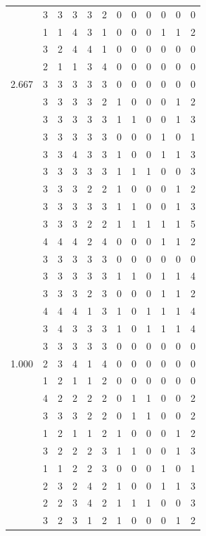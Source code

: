\documentclass[]{msu-thesis}
\theoremstyle{definition}
\theoremstyle{definition}
\theoremstyle{definition}
\theoremstyle{remark}
\begin{document}
\begin{table}
{\begin{tabular}[t]{rrrrrrrrrrrr}
 & 3 & 3 & 3 & 3 & 2 & 0 & 0 & 0 & 0 & 0 & 0\\
 & 1 & 1 & 4 & 3 & 1 & 0 & 0 & 0 & 1 & 1 & 2\\
 & 3 & 2 & 4 & 4 & 1 & 0 & 0 & 0 & 0 & 0 & 0\\
 & 2 & 1 & 1 & 3 & 4 & 0 & 0 & 0 & 0 & 0 & 0\\
2.667 & 3 & 3 & 3 & 3 & 3 & 0 & 0 & 0 & 0 & 0 & 0\\
 & 3 & 3 & 3 & 3 & 2 & 1 & 0 & 0 & 0 & 1 & 2\\
 & 3 & 3 & 3 & 3 & 3 & 1 & 1 & 0 & 0 & 1 & 3\\
 & 3 & 3 & 3 & 3 & 3 & 0 & 0 & 0 & 1 & 0 & 1\\
 & 3 & 3 & 4 & 3 & 3 & 1 & 0 & 0 & 1 & 1 & 3\\
 & 3 & 3 & 3 & 3 & 3 & 1 & 1 & 1 & 0 & 0 & 3\\
 & 3 & 3 & 3 & 2 & 2 & 1 & 0 & 0 & 0 & 1 & 2\\
 & 3 & 3 & 3 & 3 & 3 & 1 & 1 & 0 & 0 & 1 & 3\\
 & 3 & 3 & 3 & 2 & 2 & 1 & 1 & 1 & 1 & 1 & 5\\
 & 4 & 4 & 4 & 2 & 4 & 0 & 0 & 0 & 1 & 1 & 2\\
 & 3 & 3 & 3 & 3 & 3 & 0 & 0 & 0 & 0 & 0 & 0\\
 & 3 & 3 & 3 & 3 & 3 & 1 & 1 & 0 & 1 & 1 & 4\\
 & 3 & 3 & 3 & 2 & 3 & 0 & 0 & 0 & 1 & 1 & 2\\
 & 4 & 4 & 4 & 1 & 3 & 1 & 0 & 1 & 1 & 1 & 4\\
 & 3 & 4 & 3 & 3 & 3 & 1 & 0 & 1 & 1 & 1 & 4\\
 & 3 & 3 & 3 & 3 & 3 & 0 & 0 & 0 & 0 & 0 & 0\\
1.000 & 2 & 3 & 4 & 1 & 4 & 0 & 0 & 0 & 0 & 0 & 0\\
 & 1 & 2 & 1 & 1 & 2 & 0 & 0 & 0 & 0 & 0 & 0\\
 & 4 & 2 & 2 & 2 & 2 & 0 & 1 & 1 & 0 & 0 & 2\\
 & 3 & 3 & 3 & 2 & 2 & 0 & 1 & 1 & 0 & 0 & 2\\
 & 1 & 2 & 1 & 1 & 2 & 1 & 0 & 0 & 0 & 1 & 2\\
 & 3 & 2 & 2 & 2 & 3 & 1 & 1 & 0 & 0 & 1 & 3\\
 & 1 & 1 & 2 & 2 & 3 & 0 & 0 & 0 & 1 & 0 & 1\\
 & 2 & 3 & 2 & 4 & 2 & 1 & 0 & 0 & 1 & 1 & 3\\
 & 2 & 2 & 3 & 4 & 2 & 1 & 1 & 1 & 0 & 0 & 3\\
 & 3 & 2 & 3 & 1 & 2 & 1 & 0 & 0 & 0 & 1 & 2\\

\end{tabular}}
\end{table}
\end{document}
